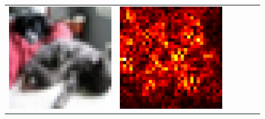 \documentclass[preprint,12pt]{elsarticle}
\begin{document}
\begin{figure}[p]
\begin{tabular}{cccccc}
  \includegraphics[scale=\scale]{../visualizations/examples/cifar10/resnet18/images/3.png} &
  \includegraphics[scale=\scale]{../visualizations/examples/cifar10/resnet18/saliency_map/3.png} & 

\end{tabular}
\end{figure}
\end{document}
